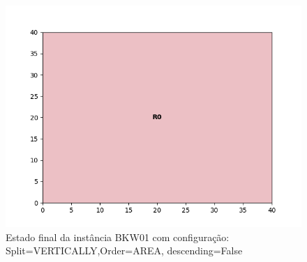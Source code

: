 \begin{figure}[H]
    \centering
    \caption[]{Estado final da instância BKW01 com configuração: Split=VERTICALLY,Order=AREA, descending=False}
    \label{fig:bkw01-vertically-area-false}
    \includegraphics[scale=0.5]{output/figures/bkw/bkw01/vertically/area/false/00}
\end{figure}